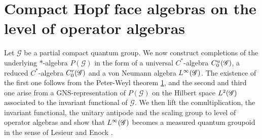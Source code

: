 \section{Compact Hopf face algebras on the level of operator algebras}


Let $\mathscr{G}$ be a partial compact quantum group. We now construct
completions of the underlying $*$-algebra $P(\mathscr{G})$ in the form
of a universal $C^{*}$-algebra $C^{u}_{0}(\mathscr{G})$, a reduced $C^{*}$-algebra
$C^{r}_{0}(\mathscr{G})$ and a von Neumann algebra $L^{\infty}(\mathscr{G})$. The existence of the first
one follows from the Peter-Weyl theorem \ref{}, and the second and
third one arise from a GNS-representation of $P(\mathscr{G})$ on the
Hilbert space $L^{2}(\mathscr{G})$ associated to the invariant functional of
$\mathscr{G}$.  We then lift the comultiplication, the invariant
functional, the unitary antipode and the scaling group to level of
operator algebras and show that $L^{\infty}(\mathscr{G})$ becomes a measured quantum
groupoid in the sense of Lesieur \cite{} and Enock \cite{}.

